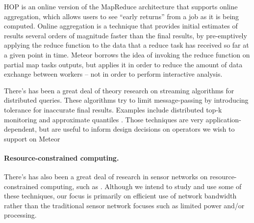 HOP \cite{hop} is an online version of the MapReduce architecture that supports online aggregation, which allows users to see “early returns” from a job as it is being computed. Online aggregation is a technique that provides initial estimates of results several orders of magnitude faster than the final results, by pre-emptively applying the reduce function to the data that a reduce task has received so far at a given point in time. Meteor borrows the idea of  invoking the reduce function on partial map tasks outputs, but applies it in order to reduce the amount of data exchange between workers – not in order to perform interactive analysis.

There’s has been a great deal of theory research on streaming algorithms for distributed queries. These algorithms try to limit message-passing by introducing tolerance for inaccurate final results. Examples include distributed top-k monitoring \cite{topk} and approximate quantiles \cite{approxquant}. Those techniques are very application-dependent, but are useful to inform design decisions on operators we wish to support on Meteor

\paragraph{Resource-constrained computing.}
There’s has also been a great deal of research in sensor networks on resource-constrained computing, such as \cite{tag}. Although we intend to study and use some of these techniques, our focus is primarily on efficient use of network bandwidth rather than the traditional sensor network focuses such as limited power and/or processing.  
